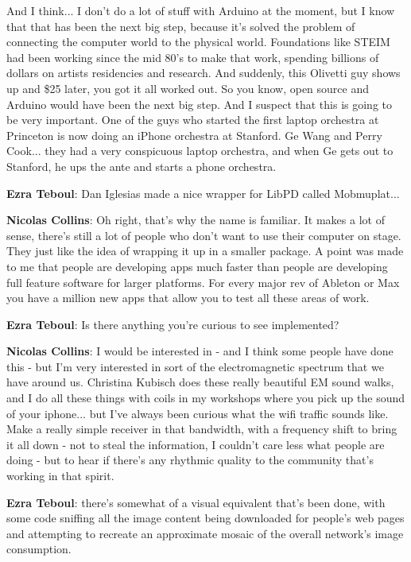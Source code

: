 And I think... I don’t do a lot of stuff with Arduino at the moment, but I know that that has been the next big step, because it’s solved the problem of connecting the computer world to the physical world. Foundations like STEIM had been working since the mid 80’s to make that work, spending billions of dollars on artists residencies and research. And suddenly, this Olivetti guy shows up and \$25 later, you got it all worked out. So you know, open source and Arduino would have been the next big step. And I suspect that this is going to be very important. One of the guys who started the first laptop orchestra at Princeton is now doing an iPhone orchestra at Stanford. Ge Wang and Perry Cook... they had a very conspicuous laptop orchestra, and when Ge gets out to Stanford, he ups the ante and starts a phone orchestra.
					
\textbf{Ezra Teboul}: Dan Iglesias made a nice wrapper for LibPD called Mobmuplat...
					
\textbf{Nicolas Collins}: Oh right, that’s why the name is familiar. It makes a lot of sense, there’s still a lot of people who don’t want to use their computer on stage. They just like the idea of wrapping it up in a smaller package. A point was made to me that people are developing apps much faster than people are developing full feature software for larger platforms. For every major rev of Ableton or Max you have a million new apps that allow you to test all these areas of work.
					
\textbf{Ezra Teboul}: Is there anything you’re curious to see implemented? 
					
\textbf{Nicolas Collins}: I would be interested in - and I think some people have done this - but I’m very interested in sort of the electromagnetic spectrum that we have around us. Christina Kubisch does these really beautiful EM sound walks, and I do all these things with coils in my workshops where you pick up the sound of your iphone... but I’ve always been curious what the wifi traffic sounds like. Make a really simple receiver in that bandwidth, with a frequency shift to bring it all down - not to steal the information, I couldn’t care less what people are doing - but to hear if there’s any rhythmic quality to the community that’s working in that spirit.
					
\textbf{Ezra Teboul}: there’s somewhat of a visual equivalent that’s been done, with some code sniffing all the image content being downloaded for people’s web pages and attempting to recreate an approximate mosaic of the overall network’s image consumption.
					
